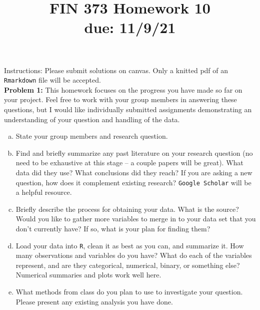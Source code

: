 \documentclass[11pt]{article}
\begin{document}
\title{FIN 373 Homework 10 \\ {\large due: \textbf{11/9/21}}}
\date{}
\maketitle

\vspace{-20mm}

\noindent Instructions: Please submit solutions on canvas.  Only a knitted pdf of an {\tt Rmarkdown} file will be accepted.
\\

\noindent \textbf{Problem 1:} This homework focuses on the progress you have made so far on your project.  Feel free to work with your group members in answering these questions, but I would like individually submitted assignments demonstrating an understanding of your question and handling of the data.

\begin{enumerate}[a.]
	\item State your group members and research question.
	\item Find and briefly summarize any past literature on your research question (no need to be exhaustive at this stage -- a couple papers will be great).  What data did they use?  What conclusions did they reach?  If you are asking a new question, how does it complement existing research? {\tt Google Scholar} will be a helpful resource.
	\item Briefly describe the process for obtaining your data.  What is the source?  Would you like to gather more variables to merge in to your data set that you don't currently have?  If so, what is your plan for finding them?    
	\item Load your data into {\tt R}, clean it as best as you can, and summarize  it.  How many observations and variables do you have?  What do each of the variables represent, and are they categorical, numerical, binary, or something else?  Numerical summaries and plots work well here.  
	\item What methods from class do you plan to use to investigate your question.  Please present any existing analysis you have done.
\end{enumerate}
\end{document}
